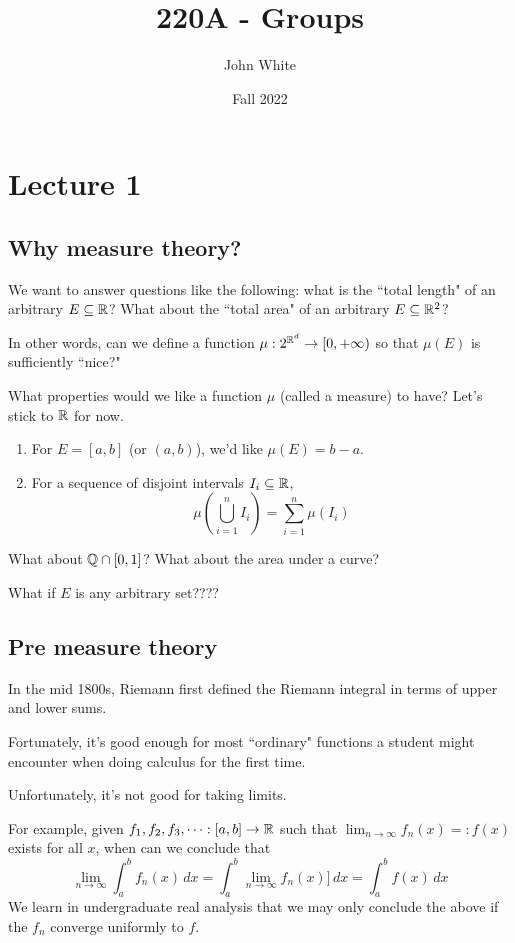 \documentclass[x11names,reqno,14pt]{extarticle}
\title{220A - Groups}
\author{John White}
\date{Fall 2022}
\begin{document}
\section*{Lecture 1}

\subsection*{Why measure theory?}

We want to answer questions like the following: what is the ``total length" of an arbitrary $E \subseteq \mathbb{R}$? What about the ``total area" of an arbitrary $E \subseteq \mathbb{R}^2$? 

In other words, can we define a function $\mu:2^{\mathbb{R}^d}\to[0, + \infty)$ so that $\mu(E)$ is sufficiently ``nice?"

What properties would we like a function $\mu$ (called a measure) to have? Let's stick to $\mathbb{R}$ for now.

\begin{enumerate}
\item For $E = [a, b]$ (or $(a, b)$), we'd like $\mu(E) = b - a$.
\item For a sequence of disjoint intervals $I_i\subseteq \mathbb{R}$, 
\[
\mu\left(\bigcup_{i=1}^nI_i\right) = \sum_{i=1}^n\mu(I_i)
\]
\end{enumerate}

What about $\mathbb{Q} \cap [0, 1]$? What about the area under a curve?

What if $E$ is any arbitrary set????

\subsection*{Pre measure theory}

In the mid 1800s, Riemann first defined the Riemann integral in terms of upper and lower sums. 

Fortunately, it's good enough for most ``ordinary" functions a student might encounter when doing calculus for the first time. 

Unfortunately, it's not good for taking limits. 

For example, given $f_1, f_2, f_3, \cdots :[a, b]\to\mathbb{R}$ such that $\lim_{n\to\infty}f_n(x) =: f(x)$ exists for all $x$, when can we conclude that
\[
\lim_{n\to\infty}\int_a^bf_n(x)\,dx = \int_a^b\lim_{n\to\infty}f_n(x)]\,dx = \int_a^bf(x)\,dx
\]
We learn in undergraduate real analysis that we may only conclude the above if the $f_n$ converge uniformly to $f$. 
\end{document}
